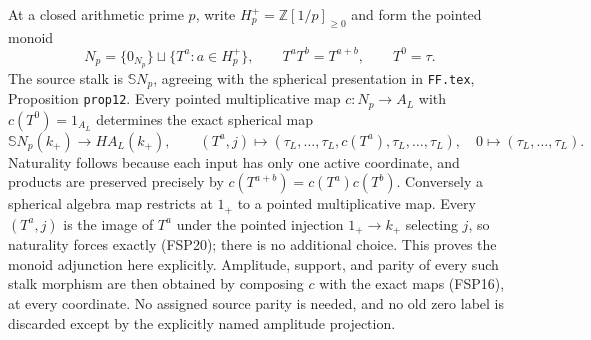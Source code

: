 At a closed arithmetic prime $p$, write
$H_p^+=\mathbb Z[1/p]_{\ge0}$ and form the pointed
monoid
\begin{equation}\tag{FSP19}
N_p=\{0_{N_p}\}\sqcup\{T^a:a\in H_p^+\},\qquad
T^aT^b=T^{a+b},\qquad T^0=\tau.
\end{equation}
The source stalk is $\mathbb S N_p$, agreeing with the
spherical presentation in \nolinkurl{FF.tex}, Proposition
\texttt{prop12}. Every pointed multiplicative map
$c:N_p\to A_L$ with $c(T^0)=1_{A_L}$ determines the
exact spherical map
\begin{equation}\tag{FSP20}
\mathbb S N_p(k_+)\longrightarrow HA_L(k_+),\qquad
(T^a,j)\longmapsto
(\tau_L,\ldots,\tau_L,c(T^a),\tau_L,\ldots,\tau_L),
\quad 0\longmapsto(\tau_L,\ldots,\tau_L).
\end{equation}
Naturality follows because each input has only one active
coordinate, and products are preserved precisely by
$c(T^{a+b})=c(T^a)c(T^b)$. Conversely a spherical
algebra map restricts at $1_+$ to a pointed multiplicative
map. Every $(T^a,j)$ is the image of $T^a$ under the
pointed injection $1_+\to k_+$ selecting $j$, so
naturality forces exactly (FSP20); there is no additional
choice. This proves the monoid adjunction here explicitly.
Amplitude, support, and parity of every such stalk morphism
are then obtained by composing $c$ with the exact maps
(FSP16), at every coordinate. No assigned source parity
is needed, and no old zero label is discarded except
by the explicitly named amplitude projection.
